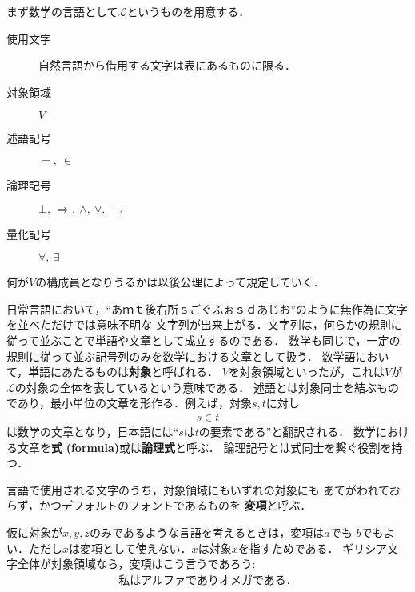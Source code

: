	まず数学の言語として$\mathcal{L}$というものを用意する．
	\begin{description}
		\item[使用文字] 自然言語から借用する文字は表にあるものに限る．
		\item[対象領域] $V$
		\item[述語記号] $=,\ \in$
		\item[論理記号] $\bot,\ \Longrightarrow,\ \wedge,\ \vee,\ \rightharpoondown$
		\item[量化記号] $\forall,\ \exists$
	\end{description}
	何が$V$の構成員となりうるかは以後公理によって規定していく．
	
	日常言語において，``あｍｔ後右所ｓごぐふぉｓｄあじお''のように無作為に文字を並べただけでは意味不明な
	文字列が出来上がる．文字列は，何らかの規則に従って並ぶことで単語や文章として成立するのである．
	数学も同じで，一定の規則に従って並ぶ記号列のみを数学における文章として扱う．
	数学語において，単語にあたるものは{\bf 対象}と呼ばれる．
	$V$を対象領域といったが，これは$V$が$\mathcal{L}$の対象の全体を表しているという意味である．
	述語とは対象同士を結ぶものであり，最小単位の文章を形作る．例えば，対象$s,t$に対し
	\begin{align}
		s \in t
	\end{align}
	は数学の文章となり，日本語には``$s$は$t$の要素である''と翻訳される．
	数学における文章を{\bf 式}
	{\bf (formula)}或は{\bf 論理式}と呼ぶ．
	論理記号とは式同士を繋ぐ役割を持つ．
	
	\begin{screen}
		\begin{dfn}[変項]
			言語で使用される文字のうち，対象領域にもいずれの対象にも
			あてがわれておらず，かつデフォルトのフォントであるものを
			{\bf 変項}と呼ぶ．
		\end{dfn}
	\end{screen}
	
	仮に対象が$x,y,z$のみであるような言語を考えるときは，変項は$a$でも
	$b$でもよい．ただし$x$は変項として使えない．$x$は対象$x$を指すためである．
	ギリシア文字全体が対象領域なら，変項はこう言うであろう:
	\begin{align}
		\mbox{私はアルファでありオメガである．}
	\end{align}
	
	
